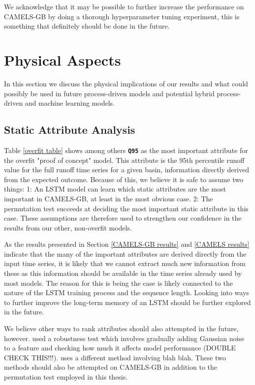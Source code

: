 We acknowledge that it may be possible to further increase the performance on 
CAMELS-GB by doing a thorough hyperparameter tuning experiment, this is 
something that definitely should be done in the future. 
\section{Physical Aspects}
In this section we discuss the physical implications of our results and what could 
possibly be used in future process-driven models and potential hybrid process-driven 
and machine learning models.
\subsection{Static Attribute Analysis}
\label{discuss static attributes}
Table \ref{overfit table} shows among others \textbf{\texttt{Q95}} as the most 
important attribute for the overfit "proof of concept" model. This attribute is the 
95th percentile runoff value for the full runoff time series for a given basin, 
information directly derived from the expected outcome. 
Because of this, we believe it is 
safe to assume two things: 1: An LSTM model can learn which static attributes are 
the most important in CAMELS-GB, at least in the most obvious case. 2: The permutation test 
succeeds at deciding the most important static attribute in this case. These 
assumptions are therefore used to strengthen our confidence in the results from 
our other, non-overfit models. 

As the results presented in Section \ref{CAMELS-GB results} and \ref{CAMELS results} 
indicate that the many of the important attributes are derived directly from the 
input time series, it is likely that we cannot extract much new information from 
these as this information should be available in the time series already used by 
most models. The reason for this is being the case is likely connected to the 
nature of the LSTM training process and the sequence length. Looking into ways 
to further improve the long-term memory of an LSTM should be further explored 
in the future.

We believe other ways to rank attributes should also attempted 
in the future, however. \citet{lstm_second_paper} used a robustness test which 
involves gradually adding Gaussian noise to a feature and checking how much it 
affects model performance (DOUBLE CHECK THIS!!!). \citet{OrigCAMELSRanking} 
uses a different method involving blah blah. These two methods should also be 
attempted on CAMELS-GB in addition to the permutation test employed in this 
thesis.



